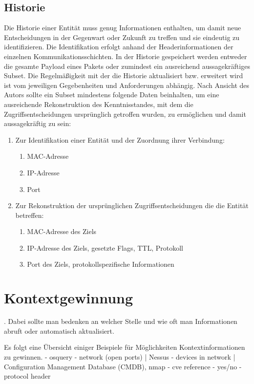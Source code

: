 \subsection{Historie}
Die Historie einer Entität muss genug Informationen enthalten, um damit neue Entscheidungen in der Gegenwart oder Zukunft zu treffen und sie eindeutig zu identifizieren. Die Identifikation erfolgt anhand der Headerinformationen der einzelnen  Kommunikationsschichten. In der Historie gespeichert werden entweder die gesamte Payload eines Pakets oder zumindest ein ausreichend aussagekräftiges Subset. Die Regelmäßigkeit mit der die Historie aktualisiert bzw. erweitert wird ist vom jeweiligen Gegebenheiten und Anforderungen abhängig. Nach Ansicht des Autors sollte ein Subset mindestens folgende Daten beinhalten, um eine ausreichende Rekonstruktion des Kenntnisstandes, mit dem die Zugriffsentscheidungen ursprünglich getroffen wurden, zu ermöglichen und damit aussagekräftig zu sein:
\begin{enumerate}
\item{Zur Identifikation einer Entität und der Zuordnung ihrer Verbindung:}
\begin{enumerate}
\item{MAC-Adresse}
\item{IP-Adresse}
\item{Port}
\end{enumerate}
\item{Zur Rekonstruktion der ursprünglichen Zugriffsentscheidungen die die Entität betreffen:}
\begin{enumerate}
\item{MAC-Adresse des Ziels}
\item{IP-Adresse des Ziels, gesetzte Flags, TTL, Protokoll}
\item{Port des Ziels, protokollspezifische Informationen}
\end{enumerate}

\end{enumerate}

\section{Kontextgewinnung}
.
Dabei sollte man bedenken an welcher Stelle und wie oft man Informationen abruft oder automatisch aktualisiert. \cite{perera_context_2014}

Es folgt eine Übersicht einiger Beispiele für Möglichkeiten Kontextinformationen zu gewinnen. 
- osquery
- network (open ports) | Nessus
- devices in network | Configuration Management Database (CMDB), nmap   
- cve reference - yes/no
- protocol header

